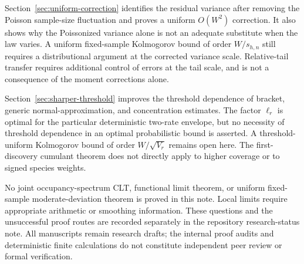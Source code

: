 \documentclass[11pt]{article}
\numberwithin{equation}{section}
\theoremstyle{remark}
\begin{document}
Section~\ref{sec:uniform-correction} identifies the residual variance after
removing the Poisson sample-size fluctuation and proves a uniform
$O(W^2)$ correction. It also shows why the Poissonized variance alone is
not an adequate substitute when the law varies. A uniform fixed-sample
Kolmogorov bound of order $W/s_{h,n}$ still requires a distributional
argument at the corrected variance scale. Relative-tail transfer requires
additional control of errors at the tail scale, and is not a consequence
of the moment corrections alone.

Section~\ref{sec:sharper-threshold} improves the threshold dependence of
bracket, generic normal-approximation, and concentration estimates. The
factor $\ell_r$ is optimal for the particular deterministic two-rate
envelope, but no necessity of threshold dependence in an optimal
probabilistic bound is asserted. A threshold-uniform Kolmogorov bound of
order $W/\sqrt{V_r}$ remains open here. The first-discovery cumulant theorem
does not directly apply to higher coverage or to signed species weights.

No joint occupancy-spectrum CLT, functional limit theorem, or uniform
fixed-sample moderate-deviation theorem is proved in this note. Local
limits require appropriate arithmetic or smoothing information. These
questions and the unsuccessful proof routes are recorded separately in
the repository research-status note. All manuscripts remain research
drafts; the internal proof audits and deterministic finite calculations
do not constitute independent peer review or formal verification.
\end{document}

